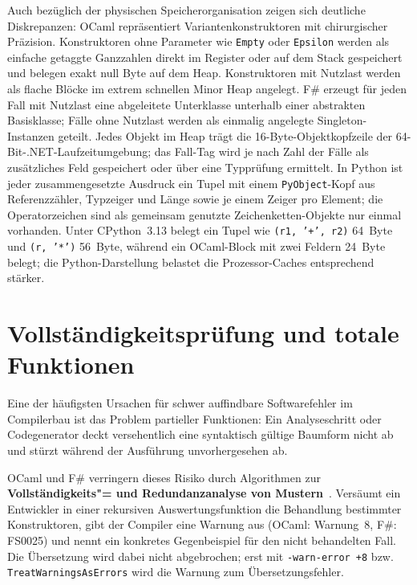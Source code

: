 Auch bezüglich der physischen Speicherorganisation zeigen sich deutliche Diskrepanzen:
OCaml repräsentiert Variantenkonstruktoren mit chirurgischer Präzision.
Konstruktoren ohne Parameter wie \texttt{Empty} oder \texttt{Epsilon} werden als einfache getaggte Ganzzahlen direkt im Register oder auf dem Stack gespeichert und belegen exakt null Byte auf dem Heap.
Konstruktoren mit Nutzlast werden als flache Blöcke im extrem schnellen Minor Heap angelegt.
F\# erzeugt für jeden Fall mit Nutzlast eine abgeleitete Unterklasse unterhalb einer abstrakten Basisklasse; Fälle ohne Nutzlast werden als einmalig angelegte Singleton-Instanzen geteilt.
Jedes Objekt im Heap trägt die 16-Byte-Objektkopfzeile der 64-Bit-.NET-Laufzeitumgebung; das Fall-Tag wird je nach Zahl der Fälle als zusätzliches Feld gespeichert oder über eine Typprüfung ermittelt.
In Python ist jeder zusammengesetzte Ausdruck ein Tupel mit einem \texttt{PyObject}-Kopf aus Referenzzähler, Typzeiger und Länge sowie je einem Zeiger pro Element; die Operatorzeichen sind als gemeinsam genutzte Zeichenketten-Objekte nur einmal vorhanden.
Unter CPython~3.13 belegt ein Tupel wie \texttt{(r1, '+', r2)} 64~Byte und \texttt{(r, '*')} 56~Byte, während ein OCaml-Block mit zwei Feldern 24~Byte belegt; die Python-Darstellung belastet die Prozessor-Caches entsprechend stärker.

\section{Vollständigkeitsprüfung und totale Funktionen}
\label{sec:exhaustiveness_checking}

Eine der häufigsten Ursachen für schwer auffindbare Softwarefehler im Compilerbau ist das Problem partieller Funktionen: Ein Analyseschritt oder Codegenerator deckt versehentlich eine syntaktisch gültige Baumform nicht ab und stürzt während der Ausführung unvorhergesehen ab.

OCaml und F\# verringern dieses Risiko durch Algorithmen zur \textbf{Vollständigkeits"= und Redundanzanalyse von Mustern}~\cite{maranget2007warnings}.
Versäumt ein Entwickler in einer rekursiven Auswertungsfunktion die Behandlung bestimmter Konstruktoren, gibt der Compiler eine Warnung aus (OCaml: Warnung~8, F\#: FS0025) und nennt ein konkretes Gegenbeispiel für den nicht behandelten Fall.
Die Übersetzung wird dabei nicht abgebrochen; erst mit \texttt{-warn-error +8} bzw. \texttt{TreatWarningsAsErrors} wird die Warnung zum Übersetzungsfehler.

